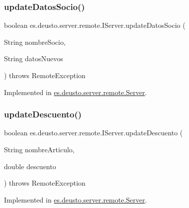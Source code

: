 \subsubsection{\texorpdfstring{updateDatosSocio()}{updateDatosSocio()}}
{\footnotesize\ttfamily boolean es.\+deusto.\+server.\+remote.\+I\+Server.\+update\+Datos\+Socio (\begin{DoxyParamCaption}\item[{String}]{nombre\+Socio,  }\item[{String}]{datos\+Nuevos }\end{DoxyParamCaption}) throws Remote\+Exception}



Implemented in \mbox{\hyperlink{classes_1_1deusto_1_1server_1_1remote_1_1_server_a3e84eab9962a99fa99c02de1000a102a}{es.\+deusto.\+server.\+remote.\+Server}}.

\mbox{\label{interfacees_1_1deusto_1_1server_1_1remote_1_1_i_server_ae6b1019df65fbd61a4f35981b883116f}} 
\subsubsection{\texorpdfstring{updateDescuento()}{updateDescuento()}}
{\footnotesize\ttfamily boolean es.\+deusto.\+server.\+remote.\+I\+Server.\+update\+Descuento (\begin{DoxyParamCaption}\item[{String}]{nombre\+Articulo,  }\item[{double}]{descuento }\end{DoxyParamCaption}) throws Remote\+Exception}



Implemented in \mbox{\hyperlink{classes_1_1deusto_1_1server_1_1remote_1_1_server_a376610f3c51b4e545c1618f5e0f32171}{es.\+deusto.\+server.\+remote.\+Server}}.

\mbox{\label{interfacees_1_1deusto_1_1server_1_1remote_1_1_i_server_aaba707260bfdd38c477bea520a440119}} 
